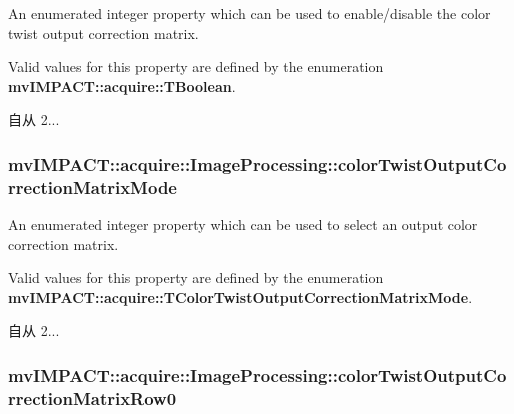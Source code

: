 An enumerated integer property which can be used to enable/disable the color twist output correction matrix. 

Valid values for this property are defined by the enumeration {\bfseries mv\+I\+M\+P\+A\+C\+T\+::acquire\+::\+T\+Boolean}.

\begin{DoxySince}{自从}
2... 
\end{DoxySince}
\hypertarget{classmv_i_m_p_a_c_t_1_1acquire_1_1_image_processing_a9c592b9bee390d8f918b0ef837604fae}{
\subsubsection[{color\+Twist\+Output\+Correction\+Matrix\+Mode}]{ mv\+I\+M\+P\+A\+C\+T\+::acquire\+::\+Image\+Processing\+::color\+Twist\+Output\+Correction\+Matrix\+Mode}}\label{classmv_i_m_p_a_c_t_1_1acquire_1_1_image_processing_a9c592b9bee390d8f918b0ef837604fae}


An enumerated integer property which can be used to select an output color correction matrix. 

Valid values for this property are defined by the enumeration {\bfseries mv\+I\+M\+P\+A\+C\+T\+::acquire\+::\+T\+Color\+Twist\+Output\+Correction\+Matrix\+Mode}.

\begin{DoxySince}{自从}
2... 
\end{DoxySince}
\hypertarget{classmv_i_m_p_a_c_t_1_1acquire_1_1_image_processing_ab21f7d6e8ab3598c45411a1d66a3a71a}{
\subsubsection[{color\+Twist\+Output\+Correction\+Matrix\+Row0}]{ mv\+I\+M\+P\+A\+C\+T\+::acquire\+::\+Image\+Processing\+::color\+Twist\+Output\+Correction\+Matrix\+Row0}}\label{classmv_i_m_p_a_c_t_1_1acquire_1_1_image_processing_ab21f7d6e8ab3598c45411a1d66a3a71a}


